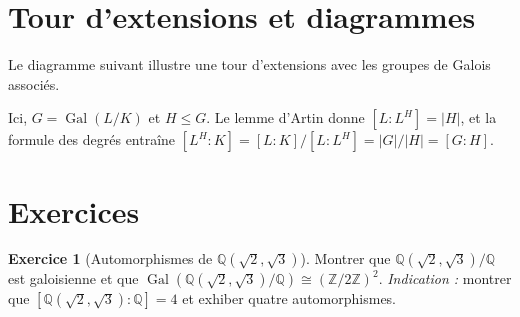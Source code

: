 \documentclass[12pt,a4paper,openany]{book}
\theoremstyle{definition}
\newtheorem{exercice}{Exercice}[chapter]
\newcommand{\Z}{\mathbb{Z}}
\newcommand{\Q}{\mathbb{Q}}
\newcommand{\Gal}{\operatorname{Gal}}
\begin{document}
\section{Tour d'extensions et diagrammes}\label{sec:tours-extensions}

Le diagramme suivant illustre une tour d'extensions avec les groupes de Galois
associés.

\begin{center}
\end{center}

\noindent
Ici, $G = \Gal(L/K)$ et $H \leq G$. Le lemme d'Artin donne $[L:L^H] = |H|$,
et la formule des degrés entraîne $[L^H:K] = [L:K]/[L:L^H] = |G|/|H| = [G:H]$.

\begin{center}
\end{center}

\section{Exercices}\label{sec:exercices-chap11}

\begin{exercice}[Automorphismes de $\Q(\sqrt{2},\sqrt{3})$]\label{exo:aut-sqrt2-sqrt3}
Montrer que $\Q(\sqrt{2},\sqrt{3})/\Q$ est galoisienne et que
$\Gal(\Q(\sqrt{2},\sqrt{3})/\Q) \cong (\Z/2\Z)^2$.
\emph{Indication :} montrer que $[\Q(\sqrt{2},\sqrt{3}):\Q] = 4$ et
exhiber quatre automorphismes.
\end{exercice}
\end{document}
